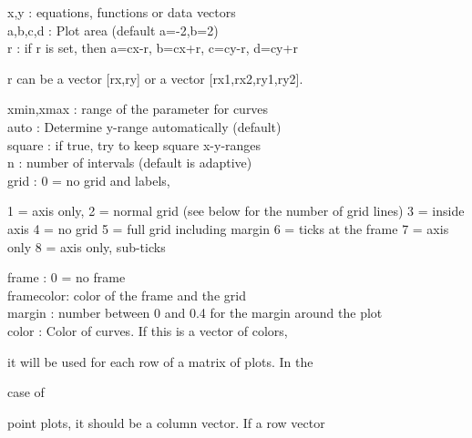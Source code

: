 \documentclass[a4paper,10pt]{article}
\begin{document}
\begin{eulernotebook}
\begin{eulercomment}
\begin{eulercomment}
\begin{eulercomment}
\begin{eulercomment}
\begin{eulercomment}
\begin{eulercomment}
\begin{eulercomment}
\begin{eulercomment}
\begin{eulercomment}
x,y       : equations, functions or data vectors\\
a,b,c,d   : Plot area (default a=-2,b=2)\\
r         : if r is set, then a=cx-r, b=cx+r, c=cy-r, d=cy+r\\
\end{eulercomment}
\begin{eulerttcomment}
            r can be a vector [rx,ry] or a vector [rx1,rx2,ry1,ry2].
\end{eulerttcomment}
\begin{eulercomment}
xmin,xmax : range of the parameter for curves\\
auto      : Determine y-range automatically (default)\\
square    : if true, try to keep square x-y-ranges\\
n         : number of intervals (default is adaptive)\\
grid      : 0 = no grid and labels,\\
\end{eulercomment}
\begin{eulerttcomment}
            1 = axis only,
            2 = normal grid (see below for the number of grid lines)
            3 = inside axis
            4 = no grid
            5 = full grid including margin
            6 = ticks at the frame
            7 = axis only
            8 = axis only, sub-ticks
\end{eulerttcomment}
\begin{eulercomment}
frame     : 0 = no frame\\
framecolor: color of the frame and the grid\\
margin    : number between 0 and 0.4 for the margin around the plot\\
color     : Color of curves. If this is a vector of colors,\\
\end{eulercomment}
\begin{eulerttcomment}
            it will be used for each row of a matrix of plots. In the
\end{eulerttcomment}
\begin{eulercomment}
case of\\
\end{eulercomment}
\begin{eulerttcomment}
            point plots, it should be a column vector. If a row vector
\end{eulerttcomment}
\begin{eulercomment}

\end{eulercomment}
\end{eulercomment}
\end{eulercomment}
\end{eulercomment}
\end{eulercomment}
\end{eulercomment}
\end{eulercomment}
\end{eulercomment}
\end{eulercomment}
\end{eulernotebook}
\end{document}
